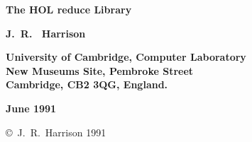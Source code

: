 
\begin{titlepage}

\setcounter{page}{1}                      %


\mbox{}
\vskip20mm
\begin{center}
{\Huge\bf The HOL reduce Library}
\end{center}


\vskip15mm
\begin{center}
\large\bf J.\ R. \ Harrison
\end{center}


\vfill
\begin{center}
\bf
University of Cambridge, Computer Laboratory\\
New Museums Site, Pembroke Street\\
Cambridge, {\small\bf CB}2 3{\small\bf QG}, England.
\end{center}


\vskip5mm
\begin{center}
\bf June 1991
\end{center}

\end{titlepage}

\thispagestyle{empty}
\mbox{}

\vfill
\begin{center}
\copyright\ J.\ R.\ Harrison 1991
\end{center}
\newpage
